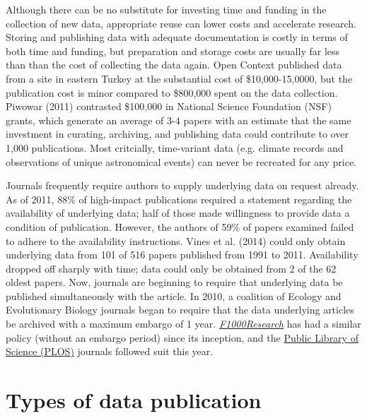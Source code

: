 \documentclass[10pt,twocolumn]{article}
\begin{document}
Although there can be no substitute for investing time and funding in the collection of new data, appropriate reuse can lower costs and accelerate research. 
Storing and publishing data with adequate documentation is costly in terms of both time and funding, but preparation and storage costs are usually far less than than the cost of collecting the data again.
Open Context published data from a site in eastern Turkey at the substantial cost of \$10,000-15,0000, but the publication cost is minor compared to \$800,000 spent on the data collection.\cite{kansa_we_2014}
Piwowar (2011) contrasted \$100,000 in National Science Foundation (NSF) grants, which generate an average of 3-4 papers with an estimate that the same investment in curating, archiving, and publishing data could contribute to over 1,000 publications.\cite{piwowar_data_2011}
Most critcially, time-variant data (e.g. climate records and observations of unique astronomical events) can never be recreated for any price.\cite{gray_online_2002}

Journals frequently require authors to supply underlying data on request already.
As of 2011, 88\% of high-impact publications required a statement regarding the availability of underlying data; half of those made willingness to provide data a condition of publication.\cite{alsheikh-ali_public_2011}
However, the authors of 59\% of papers examined failed to adhere to the availability instructions.
Vines et al. (2014)\cite{vines_availability_2014} could only obtain underlying data from 101 of 516 papers published from 1991 to 2011.
Availability dropped off sharply with time; data could only be obtained from 2 of the 62 oldest papers.
Now, journals are beginning to require that underlying data be published simultaneously with the article.
In 2010, a coalition of Ecology and Evolutionary Biology journals began to require that the data underlying articles be archived with a maximum embargo of 1 year.\cite{whitlock_data_2010, fairbairn_advent_2010}
\href{http://f1000research.com}{\emph{F1000Research}} has had a similar policy (without an embargo period) since its inception, and the {\href{http://www.plos.org/}{Public Library of Science (PLOS)}} journals followed suit this year.\cite{bloom_data_2014}

\section*{Types of data publication}\label{types-of-data-publication}
\end{document}
